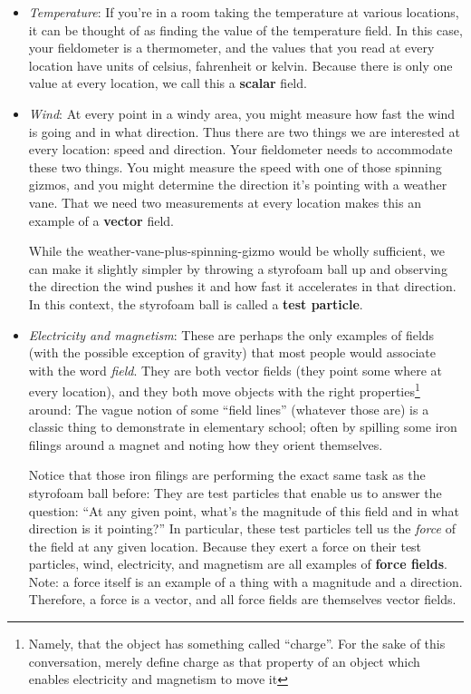 \documentclass[11pt]{article}
\begin{document}
\begin{itemize}
  \item \emph{Temperature}: If you're in a room taking the temperature at various locations, it can be thought of as finding the value of the temperature field.  In this case, your fieldometer is a thermometer, and the values that you read at every location have units of celsius, fahrenheit or kelvin.  Because there is only one value at every location, we call this a \textbf{scalar} field.
  \item \emph{Wind}: At every point in a windy area, you might measure how fast the wind is going and in what direction.  Thus there are two things we are interested at every location: speed and direction.  Your fieldometer needs to accommodate these two things.  You might measure the speed with one of those spinning gizmos, and you might determine the direction it's pointing with a weather vane.  That we need two measurements at every location makes this an example of a \textbf{vector} field.
  
While the weather-vane-plus-spinning-gizmo would be wholly sufficient, we can make it slightly simpler by throwing a styrofoam ball up and observing the direction the wind pushes it and how fast it accelerates in that direction.  In this context, the styrofoam ball is called a \textbf{test particle}.
  \item \emph{Electricity and magnetism}:  These are perhaps the only examples of fields (with the possible exception of gravity) that most people would associate with the word \emph{field}.  They are both vector fields (they point some where at every location), and they both move objects with the right properties\footnote{Namely, that the object has something called ``charge''.  For the sake of this conversation, merely define charge as that property of an object which enables electricity and magnetism to move it} around:  The vague notion of some ``field lines'' (whatever those are) is a classic thing to demonstrate in elementary school; often by spilling some iron filings around a magnet and noting how they orient themselves.
  
Notice that those iron filings are performing the exact same task as the styrofoam ball before:   They are test particles that enable us to answer the question: ``At any given point, what's the magnitude of this field and in what direction is it pointing?''  In particular, these test particles tell us the \emph{force} of the field at any given location.  Because they exert a force on their test particles, wind, electricity, and magnetism are all examples of \textbf{force fields}.  Note: a force itself is an example of a thing with a magnitude and a direction.  Therefore, a force is a vector, and all force fields are themselves vector fields.
\end{itemize}
\end{document}
